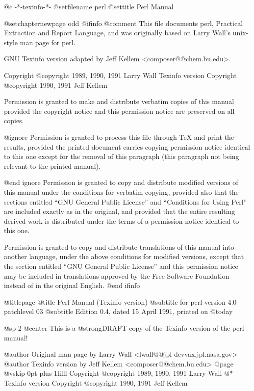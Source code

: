    @c -*-texinfo-*-
@setfilename perl
@settitle Perl Manual

@setchapternewpage odd
@ifinfo
@comment %
This file documents perl, Practical Extraction and Report Language, and
was originally based on Larry Wall's unix-style man page for perl.

GNU Texinfo version adapted by Jeff Kellem <composer@@chem.bu.edu>.

Copyright @copyright{} 1989, 1990, 1991 Larry Wall
Texinfo version Copyright @copyright{} 1990, 1991 Jeff Kellem

Permission is granted to make and distribute verbatim copies of this
manual provided the copyright notice and this permission notice are
preserved on all copies.

@ignore
Permission is granted to process this file through TeX and print the
results, provided the printed document carries copying permission
notice identical to this one except for the removal of this paragraph
(this paragraph not being relevant to the printed manual).

@end ignore
Permission is granted to copy and distribute modified versions of this
manual under the conditions for verbatim copying, provided also that the
sections entitled ``GNU General Public License'' and ``Conditions for
Using Perl'' are included exactly as in the original, and provided that
the entire resulting derived work is distributed under the terms of a
permission notice identical to this one.

Permission is granted to copy and distribute translations of this manual
into another language, under the above conditions for modified versions,
except that the section entitled ``GNU General Public License'' and this
permission notice may be included in translations approved by the Free
Software Foundation instead of in the original English.
@end ifinfo

@titlepage
@title Perl Manual (Texinfo version)
@subtitle for perl version 4.0 patchlevel 03
@subtitle Edition 0.4, dated 15 April 1991, printed on @today{}

@sp 2
@center This is a @strong{DRAFT} copy of the Texinfo version of the perl manual!

@author Original man page by Larry Wall <lwall@@jpl-devvax.jpl.nasa.gov>
@author Texinfo version by Jeff Kellem <composer@@chem.bu.edu>
@page
@vskip 0pt plus 1filll
Copyright @copyright{} 1989, 1990, 1991 Larry Wall
@*
Texinfo version Copyright @copyright{} 1990, 1991 Jeff Kellem


